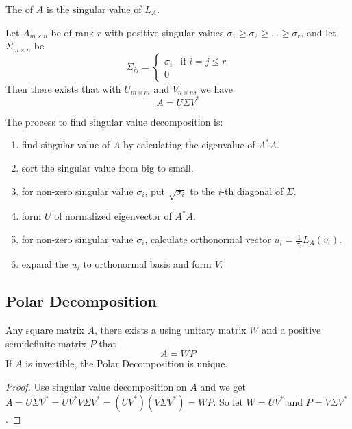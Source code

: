 \begin{definition}
    The  of $A$ is the singular value of $L_A$.
\end{definition}

\begin{theorem}
    Let $A_{m \times n}$ be of rank $r$ with positive singular values $\sigma_1 \geq \sigma_2 \geq \dots \geq \sigma_r$, and let $\Sigma_{m \times n}$ be
    \begin{equation}
        \Sigma_{ij} = \begin{cases}
            \sigma_i & \text{if } i = j \leq r \\
            0
        \end{cases}
    \end{equation}
    Then there exists  that with $U_{m \times m}$ and $V_{n \times n}$, we have
    \begin{equation}
        A = U \Sigma V^*
    \end{equation}
    
    The process to find singular value decomposition is:
    \begin{enumerate}
        \item find singular value of $A$ by calculating the eigenvalue of $A^*A$.
        \item sort the singular value from big to small.
        \item for non-zero singular value $\sigma_i$, put $\sqrt{\sigma_i}$ to the $i$-th diagonal of $\Sigma$.
        \item form $U$ of normalized eigenvector of $A^*A$.
        \item for non-zero singular value $\sigma_i$, calculate orthonormal vector $\displaystyle u_i = \frac{1}{\sigma_i} L_A(v_i)$.
        \item expand the $u_i$ to orthonormal basis and form $V$.
    \end{enumerate}
\end{theorem}



\subsection{Polar Decomposition}

\begin{theorem}
    Any square matrix $A$, there exists a  using unitary matrix $W$ and a positive semidefinite matrix $P$ that 
    \begin{equation}
        A = WP
    \end{equation}
    If $A$ is invertible, the Polar Decomposition is unique.
\end{theorem}
\begin{proof}
    Use singular value decomposition on $A$ and we get $A = U \Sigma V^* = U V^* V \Sigma V^* = ( U V^*) ( V \Sigma V^*) =  WP$.
    So let $W = U V^*$ and $P = V \Sigma V^*$.
\end{proof}



